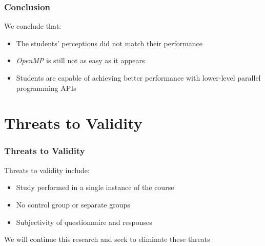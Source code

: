\documentclass[10pt, compress, aspectratio=169]{beamer}
\begin{document}
\begin{frame}
    \frametitle{Conclusion}
    We conclude that:

    \begin{itemize}
        \item The students' perceptions did not match their performance
        \item \textit{OpenMP} is still not as easy as it appears
        \item Students are capable of achieving better performance with
            lower-level parallel programming APIs
    \end{itemize}
\end{frame}

\section{Threats to Validity}

\begin{frame}
    \frametitle{Threats to Validity}
    Threats to validity include:

    \begin{itemize}
        \item Study performed in a single instance of the course
        \item No control group or separate groups
        \item Subjectivity of questionnaire and responses
    \end{itemize}

    We will continue this research and seek to eliminate these threats
\end{frame}

\maketitle
\end{document}
